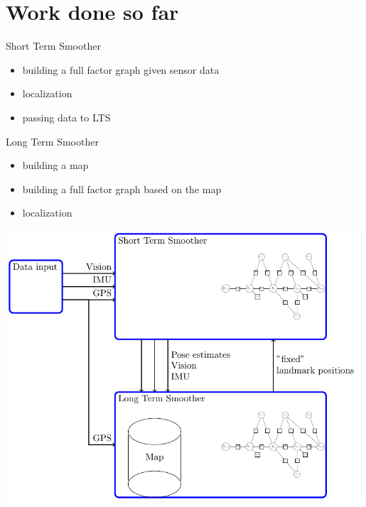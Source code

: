 \documentclass[%
    fourtothree=true, %
    DepLogo=true     %
    ]{ETHpres}
\begin{document}
\section*{Work done so far}
\begin{minipage}{0.4\textwidth}

\footnotesize
	 Short Term Smoother 
		\begin{itemize}
			\item[\ETHitem] building a full factor graph given sensor data
			\item[\ETHitem] localization 
			\item[\ETHitem] passing data to LTS
		\end{itemize}
		
\footnotesize		
	 Long Term Smoother
		\begin{itemize}
		 	\item[\ETHitem] building a map
		 	\item[\ETHitem] building a full factor graph based on the map
		 	\item[\ETHitem] localization
		\end{itemize}
\end{minipage}
\hspace{0.2cm}
\begin{minipage}{0.59\textwidth}
	\centering
	\includegraphics[width=0.99\textwidth]{TikZ_drawings/STS_and_LTS/STS_and_LTS.pdf}\\
\end{minipage}
\end{document}
